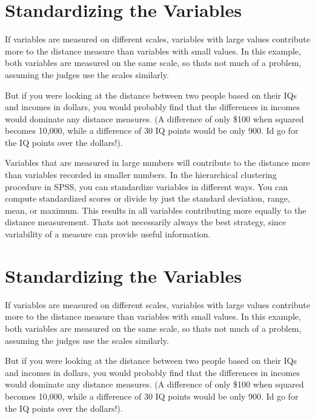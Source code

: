 \section{Standardizing the Variables}
If variables are measured on different scales, variables with large values contribute
more to the distance measure than variables with small values. In this example, both
variables are measured on the same scale, so thats not much of a problem, assuming
the judges use the scales similarly. 

But if you were looking at the distance between two people based on their IQs and incomes in dollars, you would probably find that the
differences in incomes would dominate any distance measures. (A difference of only
\$100 when squared becomes 10,000, while a difference of 30 IQ points would be only
900. Id go for the IQ points over the dollars!).

Variables that are measured in large numbers will contribute to the distance more than variables recorded in smaller
numbers.
In the hierarchical clustering procedure in SPSS, you can standardize variables in
different ways. You can compute standardized scores or divide by just the standard
deviation, range, mean, or maximum. This results in all variables contributing more
equally to the distance measurement. Thats not necessarily always the best strategy,
since variability of a measure can provide useful information. 
\newpage

\section{Standardizing the Variables}
If variables are measured on different scales, variables with large values contribute
more to the distance measure than variables with small values. In this example, both
variables are measured on the same scale, so thats not much of a problem, assuming
the judges use the scales similarly. 

But if you were looking at the distance between two people based on their IQs and incomes in dollars, you would probably find that the
differences in incomes would dominate any distance measures. (A difference of only
\$100 when squared becomes 10,000, while a difference of 30 IQ points would be only
900. Id go for the IQ points over the dollars!).

